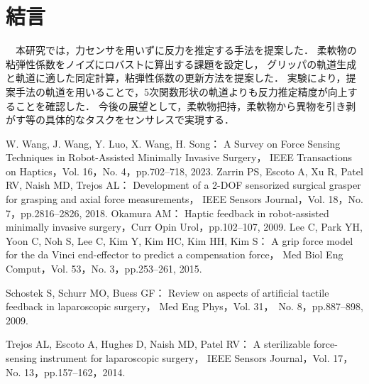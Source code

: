 \documentclass[a4paper]{jarticle}
\begin{document}
\section{結言}
　本研究では，力センサを用いずに反力を推定する手法を提案した．
柔軟物の粘弾性係数をノイズにロバストに算出する課題を設定し，
グリッパの軌道生成と軌道に適した同定計算，粘弾性係数の更新方法を提案した．
実験により，提案手法の軌道を用いることで，5次関数形状の軌道よりも反力推定精度が向上することを確認した．
今後の展望として，柔軟物把持，柔軟物から異物を引き剥がす等の具体的なタスクをセンサレスで実現する\cite{future_work1}．
\begin{thebibliography}{9}
    \setlength{\itemsep}{0pt} %
    \renewcommand{\baselinestretch}{0.8}\selectfont %
    \setlength{\parskip}{0pt} %

    W. Wang, J. Wang, Y. Luo, X. Wang, H. Song：
    A Survey on Force Sensing Techniques in Robot-Assisted Minimally Invasive Surgery，
    IEEE Transactions on Haptics，Vol. 16，No. 4，pp.702–718, 2023.
    Zarrin PS, Escoto A, Xu R, Patel RV, Naish MD, Trejos AL： 
    Development of a 2-DOF sensorized surgical grasper for grasping and axial force measurements，
    IEEE Sensors Journal，Vol. 18，No. 7，pp.2816–2826, 2018.
    Okamura AM：
    Haptic feedback in robot-assisted minimally invasive surgery，Curr Opin Urol，pp.102–107, 2009.
    Lee C, Park YH, Yoon C, Noh S, Lee C, Kim Y, Kim HC, Kim HH, Kim S：
    A grip force model for the da Vinci end-effector to predict a compensation force，
    Med Biol Eng Comput，Vol. 53，No. 3，pp.253–261, 2015.

    Schostek S, Schurr MO, Buess GF：
    Review on aspects of artificial tactile feedback in laparoscopic surgery，
    Med Eng Phys，Vol. 31，　No. 8，pp.887–898, 2009.

    
    Trejos AL, Escoto A, Hughes D, Naish MD, Patel RV：
    A sterilizable force-sensing instrument for laparoscopic surgery，
    IEEE Sensors Journal，Vol. 17，No. 13，pp.157–162，2014.


\end{thebibliography}
\end{document}
